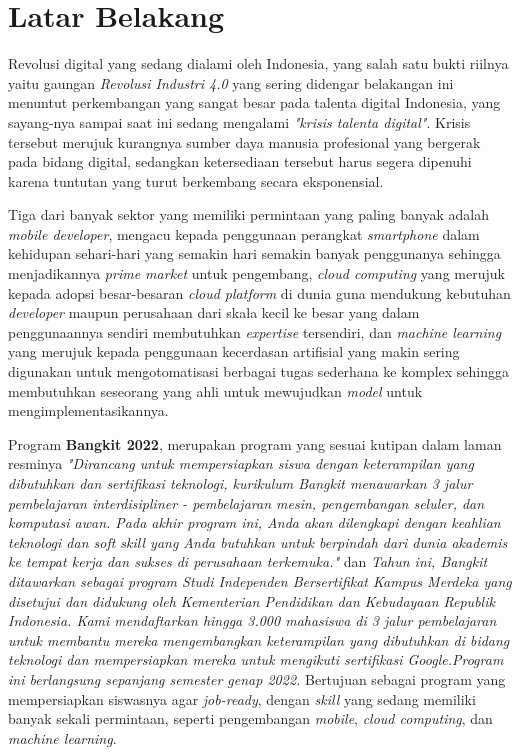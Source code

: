 \section{Latar Belakang}

Revolusi digital yang sedang dialami oleh Indonesia, yang salah satu bukti riilnya yaitu gaungan \textit{Revolusi Industri 4.0} yang sering didengar belakangan ini menuntut perkembangan yang sangat besar pada talenta digital Indonesia, yang sayang-nya sampai saat ini sedang mengalami \textit{"krisis talenta digital"}. Krisis tersebut merujuk kurangnya sumber daya manusia profesional yang bergerak pada bidang digital, sedangkan ketersediaan tersebut harus segera dipenuhi karena tuntutan yang turut berkembang secara eksponensial. 

Tiga dari banyak sektor yang memiliki permintaan yang paling banyak adalah \textit{mobile developer}, mengacu kepada penggunaan perangkat \textit{smartphone} dalam kehidupan sehari-hari yang semakin hari semakin banyak penggunanya sehingga menjadikannya \textit{prime market} untuk pengembang, \textit{cloud computing} yang merujuk kepada adopsi besar-besaran \textit{cloud platform} di dunia guna mendukung kebutuhan \textit{developer} maupun perusahaan dari skala kecil ke besar yang dalam penggunaannya sendiri membutuhkan \textit{expertise} tersendiri, dan \textit{machine learning} yang merujuk kepada penggunaan kecerdasan artifisial yang makin sering digunakan untuk mengotomatisasi berbagai tugas sederhana ke komplex sehingga membutuhkan seseorang yang ahli untuk mewujudkan \textit{model} untuk mengimplementasikannya. 

Program \textbf{Bangkit 2022}, merupakan program yang sesuai kutipan dalam laman resminya \textit{"Dirancang untuk mempersiapkan siswa dengan keterampilan yang dibutuhkan dan sertifikasi teknologi, kurikulum Bangkit menawarkan 3 jalur pembelajaran interdisipliner - pembelajaran mesin, pengembangan seluler, dan komputasi awan. Pada akhir program ini, Anda akan dilengkapi dengan keahlian teknologi dan soft skill yang Anda butuhkan untuk berpindah dari dunia akademis ke tempat kerja dan sukses di perusahaan terkemuka."} dan \textit{Tahun ini, Bangkit ditawarkan sebagai program Studi Independen Bersertifikat Kampus Merdeka yang disetujui dan didukung oleh Kementerian Pendidikan dan Kebudayaan Republik Indonesia. Kami mendaftarkan hingga 3.000 mahasiswa di 3 jalur pembelajaran untuk membantu mereka mengembangkan keterampilan yang dibutuhkan di bidang teknologi dan mempersiapkan mereka untuk mengikuti sertifikasi Google.Program ini berlangsung sepanjang semester genap 2022.} Bertujuan sebagai program yang mempersiapkan siswasnya agar \textit{job-ready}, dengan \textit{skill} yang sedang memiliki banyak sekali permintaan, seperti pengembangan \textit{mobile}, \textit{cloud computing}, dan \textit{machine learning}.

